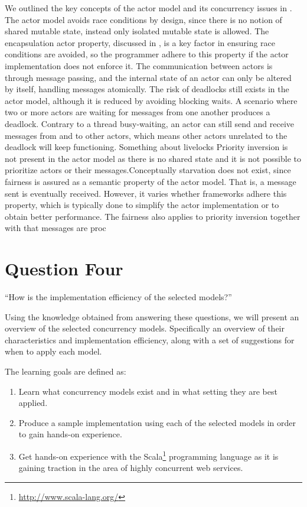 We outlined the key concepts of the actor model and its concurrency issues in . The actor model avoids race conditions by design, since there is no notion of shared mutable state, instead only isolated mutable state is allowed. The encapsulation actor property, discussed in , is a key factor in ensuring race conditions are avoided, so the programmer adhere to this property if the actor implementation does not enforce it. The communication between actors is through message passing, and the internal state of an actor can only be altered by itself, handling messages atomically. The risk of deadlocks still exists in the actor model, although it is reduced by avoiding blocking waits. A scenario where two or more actors are waiting for messages from one another produces a deadlock. Contrary to a thread busy-waiting, an actor can still send and receive messages from and to other actors, which means other actors unrelated to the deadlock will keep functioning. 
Something about livelocks%
Priority inversion is not present in the actor model as there is no shared state and it is not possible to prioritize actors or their messages.Conceptually starvation does not exist, since fairness is assured as a semantic property of the actor model. That is, a message sent is eventually received. However, it varies whether frameworks adhere this property, which is typically done to simplify the actor implementation or to obtain better performance. The fairness also applies to priority inversion together with that messages are proc

\section{Question Four}
``How is the implementation efficiency of the selected models?''


Using the knowledge obtained from answering these questions, we will present an overview of the selected concurrency models. Specifically an overview of their characteristics and implementation efficiency, along with a set of suggestions for when to apply each model.




The learning goals are defined as:
\begin{enumerate}
\item Learn what concurrency models exist and in what setting they are best applied.
\item Produce a sample implementation using each of the selected models in order to gain hands-on experience.
\item Get hands-on experience with the Scala\footnote{\url{http://www.scala-lang.org/}} programming language as it is gaining traction in the area of highly concurrent web services.
\end{enumerate}
\worksheetend